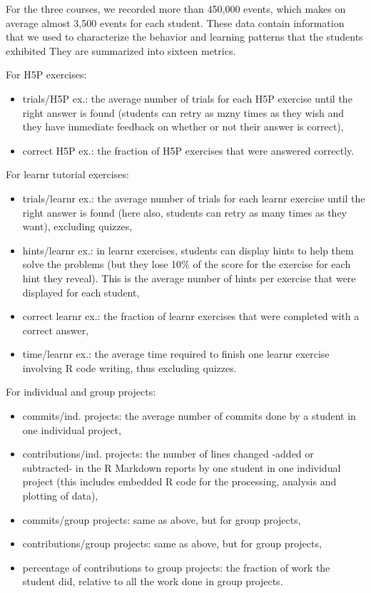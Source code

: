 \documentclass{aims}
\theoremstyle{definition}
\begin{document}
For the three courses, we recorded more than 450,000 events, which makes
on average almost 3,500 events for each student. These data contain
information that we used to characterize the behavior and learning
patterns that the students exhibited They are summarized into sixteen
metrics.

For H5P exercises:

\begin{itemize}
\item
  trials/H5P ex.: the average number of trials for each H5P exercise
  until the right answer is found (students can retry as mzny times as
  they wish and they have immediate feedback on whether or not their
  answer is correct),
\item
  correct H5P ex.: the fraction of H5P exercises that were answered
  correctly.
\end{itemize}

For learnr tutorial exercises:

\begin{itemize}
\item
  trials/learnr ex.: the average number of trials for each learnr
  exercise until the right answer is found (here also, students can
  retry as many times as they want), excluding quizzes,
\item
  hints/learnr ex.: in learnr exercises, students can display hints to
  help them solve the problems (but they lose 10\% of the score for the
  exercise for each hint they reveal). This is the average number of
  hints per exercise that were displayed for each student,
\item
  correct learnr ex.: the fraction of learnr exercises that were
  completed with a correct answer,
\item
  time/learnr ex.: the average time required to finish one learnr
  exercise involving R code writing, thus excluding quizzes.
\end{itemize}

For individual and group projects:

\begin{itemize}
\item
  commits/ind. projects: the average number of commits done by a student
  in one individual project,
\item
  contributions/ind. projects: the number of lines changed -added or
  subtracted- in the R Markdown reports by one student in one individual
  project (this includes embedded R code for the processing, analysis
  and plotting of data),
\item
  commits/group projects: same as above, but for group projects,
\item
  contributions/group projects: same as above, but for group projects,
\item
  percentage of contributions to group projects: the fraction of work
  the student did, relative to all the work done in group projects.
\end{itemize}
\end{document}
